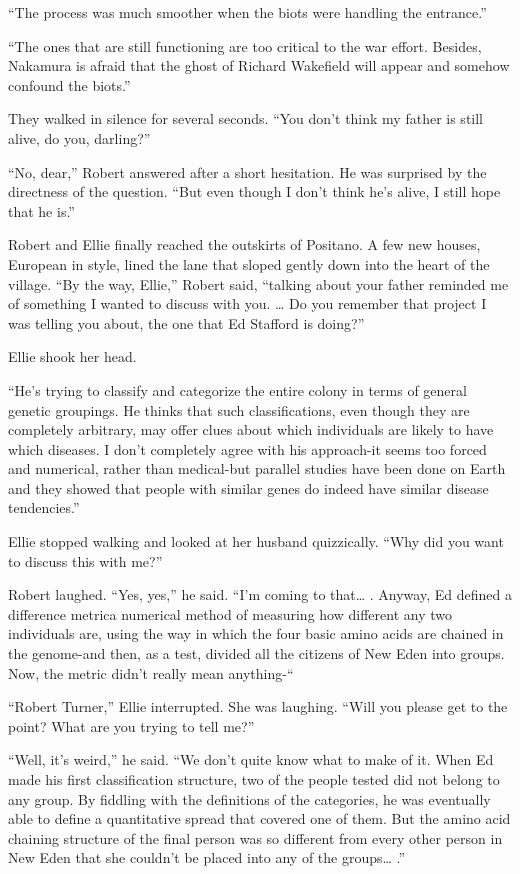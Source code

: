 \documentclass[]{article}
\begin{document}
{{“The process was much smoother when the biots were handling the entrance.”

“The ones that are still functioning are too critical to the war effort.  Besides, Nakamura is afraid that the ghost of Richard Wakefield will appear and somehow confound the biots.”

They walked in silence for several seconds.  “You don’t think my father is still alive, do you, darling?”

“No, dear,” Robert answered after a short hesitation.  He was surprised by the directness of the question.  “But even though I don’t think he’s alive, I still hope that he is.”

Robert and Ellie finally reached the outskirts of Positano.  A few new houses, European in style, lined the lane that sloped gently down into the heart of the village.  “By the way, Ellie,” Robert said, “talking about your father reminded me of something I wanted to discuss with you.  … Do you remember that project I was telling you about, the one that Ed Stafford is doing?”

Ellie shook her head.

“He’s trying to classify and categorize the entire colony in terms of general genetic groupings.  He thinks that such classifications, even though they are completely arbitrary, may offer clues about which individuals are likely to have which diseases.  I don’t completely agree with his approach-it seems too forced and numerical, rather than medical-but parallel studies have been done on Earth and they showed that people with similar genes do indeed have similar disease tendencies.”

Ellie stopped walking and looked at her husband quizzically.  “Why did you want to discuss this with me?”

Robert laughed.  “Yes, yes,” he said.  “I’m coming to that… .  Anyway, Ed defined a difference metrica numerical method of measuring how different any two individuals are, using the way in which the four basic amino acids are chained in the genome-and then, as a test, divided all the citizens of New Eden into groups.  Now, the metric didn’t really mean anything-“

“Robert Turner,” Ellie interrupted.  She was laughing.  “Will you please get to the point? What are you trying to tell me?”

“Well, it’s weird,” he said.  “We don’t quite know what to make of it.  When Ed made his first classification structure, two of the people tested did not belong to any group.  By fiddling with the definitions of the categories, he was eventually able to define a quantitative spread that covered one of them.  But the amino acid chaining structure of the final person was so different from every other person in New Eden that she couldn’t be placed into any of the groups… .”

}}
\end{document}

